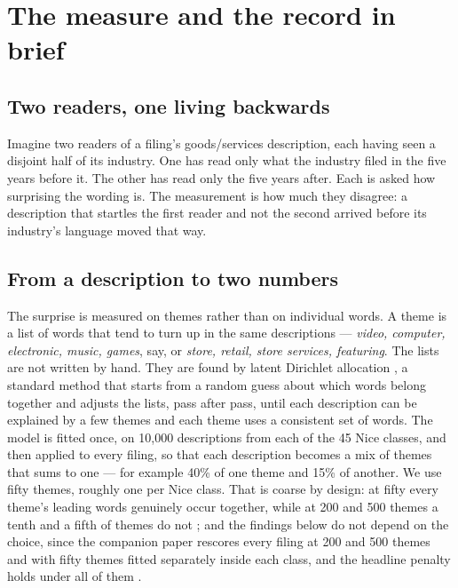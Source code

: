 \section{The measure and the record in brief}\label{sec:measure}\label{sec:construct}

\subsection{Two readers, one living backwards}

Imagine two readers of a filing's goods/services description, each having
seen a disjoint half of its industry. One has read only what the industry
filed in the five years before it. The other has read only the five years
after. Each is asked how surprising the wording is. The measurement is how
much they disagree: a description that startles the first reader and not
the second arrived before its industry's language moved that way.

\subsection{From a description to two numbers}

The surprise is measured on themes rather than on individual words. A
theme is a list of words that tend to turn up in the same descriptions
--- \emph{video, computer, electronic, music, games}, say, or \emph{store,
retail, store services, featuring}. The lists are not written by hand.
They are found by latent Dirichlet allocation \citep{Blei2003}, a
standard method that starts from a random guess about which words belong
together and adjusts the lists, pass after pass, until each description
can be explained by a few themes and each theme uses a consistent set of
words. The model is fitted once, on 10{,}000 descriptions from each of
the 45 Nice classes, and then applied to every filing, so that each
description becomes a mix of themes that sums to one --- for example 40\%
of one theme and 15\% of another. We use fifty themes, roughly one per
Nice class. That is coarse by design: at fifty every theme's leading
words genuinely occur together, while at 200 and 500 themes a tenth and
a fifth of themes do not \citep{Lau2014}; and the findings below do not
depend on the choice, since the companion paper rescores every filing at
200 and 500 themes and with fifty themes fitted separately inside each
class, and the headline penalty holds under all of them
\citep{SilverCorpus2026}.

